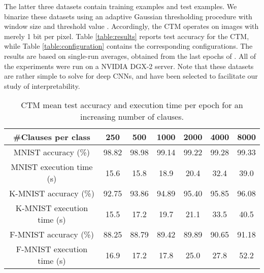 \documentclass{article}
\begin{document}
The latter three datasets contain  training examples and  test examples. We binarize these datasets using an adaptive Gaussian thresholding procedure with window size  and threshold value . Accordingly, the CTM operates on images with merely 1 bit per pixel. Table \ref{table:results} reports test accuracy for the CTM, while Table \ref{table:configuration} contains the corresponding configurations. The results are based on single-run averages, obtained from the last  epochs of . All of the experiments were run on a NVIDIA DGX-2 server. Note that these datasets are rather simple to solve for deep CNNs, and have been selected to facilitate our study of interpretability.

\begin{table*}[!!h]
\centering
\begin{tabular}{c|c|c|c|c|c|c} 
\hline
\#Clauses per class&250&500&1000&2000&4000&8000\\
\hline
\hline
MNIST accuracy (\%)&98.82&98.98&99.14&99.22&99.28&99.33\\
MNIST execution time (s)&15.6&15.8&18.9&20.4&32.4&39.0\\
\hline
K-MNIST accuracy (\%)&92.75&93.86&94.89&95.40&95.85&96.08\\
K-MNIST execution time (s)&15.5&17.2&19.7&21.1&33.5&40.5\\
\hline
F-MNIST accuracy (\%)&88.25&88.79&89.42&89.89&90.65&91.18\\
F-MNIST execution time (s)&16.9&17.2&17.8&25.0&27.8&52.2\\
\hline
\end{tabular}
\caption{CTM mean test accuracy and execution time per epoch for an increasing number of clauses.}\label{table:clauses_vs_accuracy_and_execution_time}
\end{table*}
\end{document}
